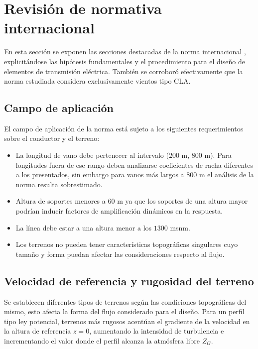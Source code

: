 \chapter{Revisión de normativa internacional}\label{Ape2}

En esta sección se exponen las secciones destacadas de la norma internacional \cite{IEC60826}, explicitándose las hipótesis fundamentales y el procedimiento para el diseño de elementos de transmisión eléctrica. También se corroboró efectivamente que la norma estudiada considera exclusivamente vientos tipo CLA.

\section{Campo de aplicación}
El campo de aplicación de la norma está sujeto a los siguientes requerimientos sobre el conductor y el terreno:

\begin{itemize}
	\item La longitud de vano debe pertenecer al intervalo ($200$ m, $800$ m). Para longitudes fuera de ese rango deben analizarse coeficientes de racha diferentes a los presentados, sin embargo para vanos más largos a $800$ m el análisis de la norma resulta sobrestimado.
	\item Altura de soportes menores a $60$ m ya que los soportes de una altura mayor podrían inducir factores de amplificación dinámicos en la respuesta.
	\item La línea debe estar a una altura menor a los $1300$ msnm.
	\item Los terrenos no pueden tener características topográficas singulares cuyo tamaño y forma puedan afectar las consideraciones respecto al flujo.
\end{itemize}

\section{Velocidad de referencia y rugosidad del terreno}
Se establecen diferentes tipos de terrenos según las condiciones topográficas del mismo, esto afecta la forma del flujo considerado para el diseño. Para un perfil tipo ley potencial, terrenos más rugosos acentúan el gradiente de la velocidad en la altura de referencia $z=0$,  aumentando la intensidad de turbulencia e incrementando el valor donde el perfil alcanza la atmósfera libre $Z_G$.

